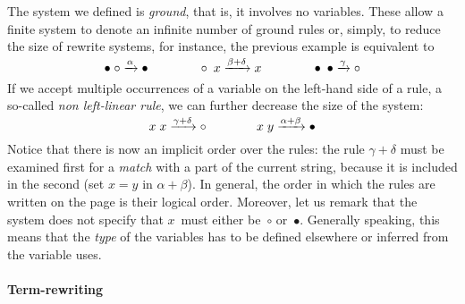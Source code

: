 The system we defined is \emph{ground}, that is, it involves no variables. These allow a finite
system to denote an infinite number of ground rules or, simply, to
reduce the size of rewrite systems, for instance, the previous example
is equivalent to
\begin{equation*}
\bullet \; \circ \xrightarrow{\smash{\alpha}} \bullet
\qquad\qquad
\circ \; x \xrightarrow{\smash{\beta+\delta}} x
\qquad\qquad
\bullet \; \bullet \xrightarrow{\smash{\gamma}} \circ
\end{equation*}
If we accept multiple occurrences of a variable on the left\hyp{}hand
side of a rule, a so\hyp{}called \emph{non left\hyp{}linear
  rule}, we can further decrease
the size of the system:
\begin{equation*}
x  \; x \xrightarrow{\smash{\gamma+\delta}} \circ\qquad\qquad
x  \; y \xrightarrow{\smash{\alpha+\beta}} \bullet
\end{equation*}
Notice that there is now an implicit order over the rules: the rule
\(\gamma+\delta\) must be examined first for a \emph{match} with a
part of the current string, because it is included in the second (set
\(x=y\) in \(\alpha+\beta\)). In general, the order in which the rules
are written on the page is their logical order. Moreover, let us
remark that the system does not specify that \(x\)~must either
be~\(\circ\) or~\(\bullet\). Generally speaking, this means that the
\emph{type} of the variables has to be defined elsewhere or inferred
from the variable uses.

\paragraph{Term-rewriting}

